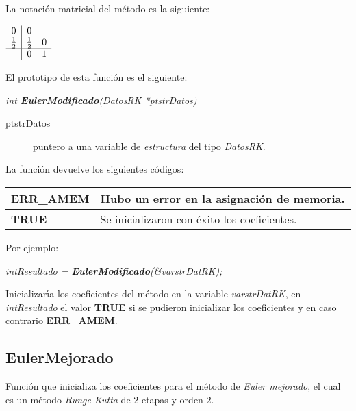 La notaci\'on matricial del m\'etodo es la siguiente:

\begin{center}
$
\begin{array}{c|cc}
0 & 0 \\
\frac{1}{2} & \frac{1}{2} & 0 \\
\hline
 & 0 & 1
\end{array}
$
\end{center}

El prototipo de esta funci\'on es el siguiente:

\begin{center}
\emph{int \textbf{EulerModificado}(DatosRK *ptstrDatos)}
\end{center}

\begin{description}
\item[ptstrDatos] puntero a una variable de \emph{estructura} del tipo
\emph{DatosRK}.
\end{description}

La funci\'on devuelve los siguientes c\'odigos:

\begin{center}
\begin{tabular}{|l|l|}
\hline
\textbf{ERR\_AMEM} & Hubo un error en la asignaci\'on de memoria. \\
\hline
\textbf{TRUE} & Se inicializaron con \'exito los coeficientes. \\
\hline
\end{tabular}
\end{center}

Por ejemplo:

\begin{center}
\emph{intResultado = \textbf{EulerModificado}(\&varstrDatRK);}
\end{center}


Inicializar\'{\i}a los coeficientes del m\'etodo en la variable
\emph{varstrDatRK}, en \emph{intResultado} el valor \textbf{TRUE} si se pudieron
inicializar los coeficientes y en caso contrario \textbf{ERR\_AMEM}.

\newpage

\subsection{EulerMejorado}
Funci\'on que inicializa los coeficientes para el m\'etodo de \emph{Euler mejorado},
el cual es un m\'etodo \emph{Runge-Kutta} de $2$ etapas y orden $2$.\newline

